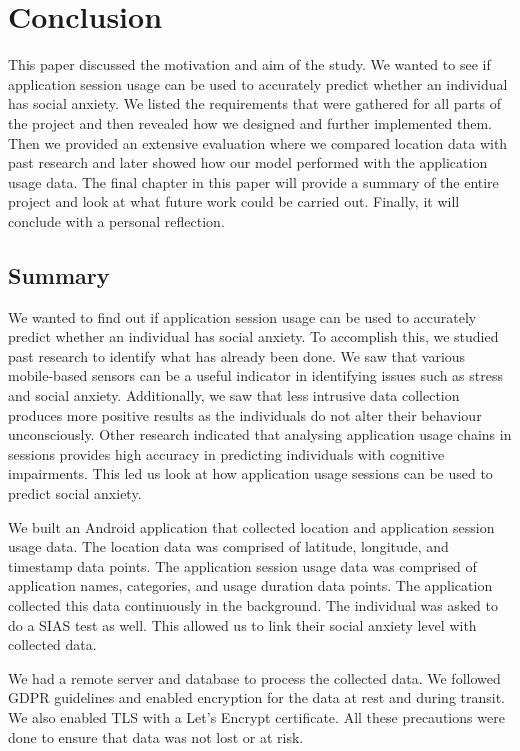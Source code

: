 \documentclass{l4proj}
\begin{document}
\chapter{Conclusion} \label{conclusion}
This paper discussed the motivation and aim of the study. We wanted to see if application session usage can be used to accurately predict whether an individual has social anxiety. We listed the requirements that were gathered for all parts of the project and then revealed how we designed and further implemented them. Then we provided an extensive evaluation where we compared location data with past research and later showed how our model performed with the application usage data. The final chapter in this paper will provide a summary of the entire project and look at what future work could be carried out. Finally, it will conclude with a personal reflection.

\section{Summary}
We wanted to find out if application session usage can be used to accurately predict whether an individual has social anxiety. To accomplish this, we studied past research to identify what has already been done. We saw that various mobile-based sensors can be a useful indicator in identifying issues such as stress and social anxiety. Additionally, we saw that less intrusive data collection produces more positive results as the individuals do not alter their behaviour unconsciously. Other research indicated that analysing application usage chains in sessions provides high accuracy in predicting individuals with cognitive impairments. This led us look at how application usage sessions can be used to predict social anxiety.

We built an Android application that collected location and application session usage data. The location data was comprised of latitude, longitude, and timestamp data points. The application session usage data was comprised of application names, categories, and usage duration data points. The application collected this data continuously in the background. The individual was asked to do a SIAS test as well. This allowed us to link their social anxiety level with collected data.

We had a remote server and database to process the collected data. We followed GDPR guidelines and enabled encryption for the data at rest and during transit. We also enabled TLS with a Let's Encrypt certificate. All these precautions were done to ensure that data was not lost or at risk.
\end{document}
